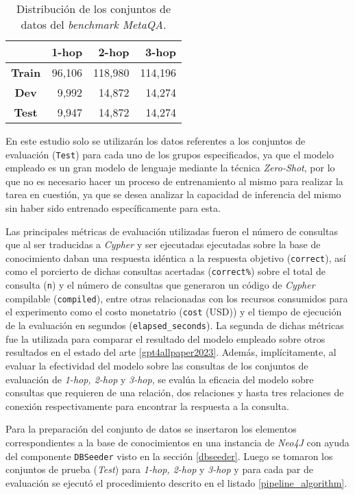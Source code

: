 \begin{table}[h]
\centering
\begin{tabular}{|c|r|r|r|}
\hline
 & \textbf{1-hop} & \textbf{2-hop} & \textbf{3-hop} \\ \hline
\textbf{Train} & 96,106 & 118,980 & 114,196 \\ \hline
\textbf{Dev} & 9,992 & 14,872 & 14,274 \\ \hline
\textbf{Test} & 9,947 & 14,872 & 14,274 \\ \hline
\end{tabular}
\caption{Distribución de los conjuntos de datos del \textit{benchmark MetaQA}.}
\label{tab:metaqatable}
\end{table}

En este estudio solo se utilizarán los datos referentes a los conjuntos de evaluación (\texttt{Test}) para cada uno de los grupos especificados, ya que el modelo empleado es un gran modelo de lenguaje mediante la técnica \textit{Zero-Shot}, por lo que no es necesario hacer un proceso de entrenamiento al mismo para realizar la tarea en cuestión, ya que se desea analizar la capacidad de inferencia del mismo sin haber sido entrenado específicamente para esta.

Las principales métricas de evaluación utilizadas fueron el número de consultas que al ser traducidas a \textit{Cypher} y ser ejecutadas ejecutadas sobre la base de conocimiento daban una respuesta idéntica a la respuesta objetivo (\texttt{correct}), así como el porcierto de dichas consultas acertadas (\texttt{correct\%}) sobre el total de consulta (\texttt{n}) y el número de consultas que generaron un código de \textit{Cypher} compilable (\texttt{compiled}), entre otras relacionadas con los recursos consumidos para el experimento como el costo monetatrio (\texttt{cost} (USD)) y el tiempo de ejecución de la evaluación en segundos (\texttt{elapsed\_seconds}). La segunda de dichas métricas fue la utilizada para comparar el resultado del modelo empleado sobre otros resultados en el estado del arte \ref{gpt4allpaper2023}. Además, implícitamente, al evaluar la efectividad del modelo sobre las consultas de los conjuntos de evaluación de \textit{1-hop, 2-hop} y \textit{3-hop}, se evalúa la eficacia del modelo sobre consultas que requieren de una relación, dos relaciones y hasta tres relaciones de conexión respectivamente para encontrar la respuesta a la consulta.

Para la preparación del conjunto de datos se insertaron los elementos correspondientes a la base de conocimientos en una instancia de \textit{Neo4J} con ayuda del componente \texttt{DBSeeder} visto en la sección \ref{dbseeder}. Luego se tomaron los conjuntos de prueba (\textit{Test}) para \textit{1-hop, 2-hop} y \textit{3-hop} y para cada par de evaluación se ejecutó el procedimiento descrito en el listado \ref{pipeline_algorithm}.

